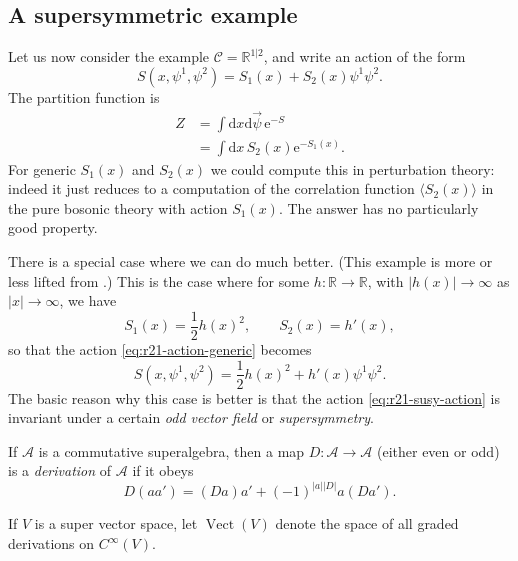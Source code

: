 \documentclass[12pt,letterpaper,reqno]{article}
\numberwithin{equation}{section}
\newcommand{\cC}{\ensuremath{\mathcal C}}
\newcommand{\cA}{\ensuremath{\mathcal A}}
\newcommand{\R}{\ensuremath{\mathbb R}}
\newcommand{\half}{\ensuremath{\frac{1}{2}}}
\newcommand{\e}{{\mathrm e}}
\newcommand{\de}{\mathrm{d}}
\newcommand{\abs}[1]{\lvert#1\rvert}
\newcommand{\IP}[1]{\langle#1\rangle}
\newcommand{\ti}[1]{\textit{#1}}
\DeclareMathOperator{\Vect}{Vect}
\begin{document}
\subsection{A supersymmetric example} \label{sec:0d-susy-example}

Let us now consider the example $\cC = \R^{1 \vert 2}$, and write an action
of the form
\begin{equation} \label{eq:r21-action-generic}
  S(x, \psi^1, \psi^2) = S_1(x) + S_2(x) \psi^1 \psi^2.
\end{equation}
The partition function is
\begin{align}
  Z &= \int \de x \de \vec\psi \, \e^{-S} \\
  &= \int \de x \, S_2(x) \e^{-S_1(x)}.
\end{align}
For generic $S_1(x)$ and $S_2(x)$
we could compute this in perturbation theory:
indeed it just reduces to a computation of the correlation
function $\IP{S_2(x)}$ in 
the pure bosonic theory with action $S_1(x)$.
The answer has no particularly good property.

There is a special case where we can do much better.
(This example is more or less lifted from \cite{MR2003030}.)
This is the case where for some $h: \R \to \R$, with $\abs{h(x)} \to \infty$ 
as $\abs{x} \to \infty$, we have
\begin{equation}
  S_1(x) = \half h(x)^2, \qquad S_2(x) = h'(x),
\end{equation}
so that the action \eqref{eq:r21-action-generic} becomes
\begin{equation}\label{eq:r21-susy-action}
  S(x, \psi^1, \psi^2) = \half h(x)^2 + h'(x) \psi^1 \psi^2.
\end{equation}
The basic reason why this case is better is that the
action \eqref{eq:r21-susy-action} is invariant under a 
certain \ti{odd vector field}
or \ti{supersymmetry}.

\begin{defn}
If $\cA$ is a commutative superalgebra, then a map $D: \cA \to \cA$
(either even or odd)
is a \ti{derivation} of $\cA$ if it obeys
\begin{equation}
  D(aa') = (Da)a' + (-1)^{\abs{a} \abs{D}} a(Da').
\end{equation}
\end{defn}

\begin{defn}
If $V$ is a super vector space, let $\Vect(V)$ denote the
space of all graded derivations on $C^\infty(V)$.
\end{defn}
\end{document}
